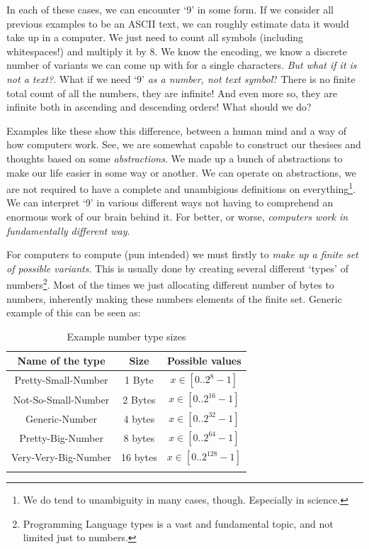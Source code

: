 \documentclass{article}
\begin{document}
            In each of these cases, we can encounter `9' in some form. If we consider all previous examples to be an ASCII text, we can roughly estimate data it would take up in 
            a computer. We just need to count all symbols (including whitespaces!) and multiply it by 8. We know the encoding, we know a discrete number of variants we can
            come up with for a single characters. \emph{But what if it is not a text?}. What if we need `9' \emph{as a number, not text symbol}? There is no finite total count
            of all the numbers, they are infinite! And even more so, they are infinite both in ascending and descending orders! What should we do? \par
            
            Examples like these show this difference, between a human mind and a way of how computers work. See, we are somewhat capable to construct our thesises and thoughts
            based on some \emph{abstractions}. We made up a bunch of abstractions to make our life easier in some way or another. We can operate on abstractions, we are not required
            to have a complete and unambigious definitions on everything\footnote{We do tend to unambiguity in many cases, though. Especially in science.}. We can interpret `9' in various
            different ways not having to comprehend an enormous work of our brain behind it. For better, or worse, \emph{computers work in fundamentally different way}.
            
            For computers to compute (pun intended) we must firstly to \emph{make up a finite set of possible variants}. This is usually done by creating several different
            `types' of numbers\footnote{Programming Language types is a vast and fundamental topic, and not limited just to numbers.}. Most of the times we just allocating 
            different number of bytes to numbers, inherently making these numbers elements of the finite set. Generic example of this can be seen as:
            
            \begin{table}[H]
                \centering
                \begin{longtable}{|c|c|c|}
                    \hline
                    Name of the type & Size & Possible values \\\hline
                    Pretty-Small-Number & 1 Byte & $x \in [0..2^8 - 1]$ \\\hline
                    Not-So-Small-Number & 2 Bytes & $x \in [0..2^{16} - 1]$\\\hline
                    Generic-Number & 4 bytes & $x \in [0..2^{32} - 1]$\\\hline
                    Pretty-Big-Number & 8 bytes & $x \in [0..2^{64} - 1]$\\\hline
                    Very-Very-Big-Number & 16 bytes & $x \in [0..2^{128} - 1]$\\\hline
                    \caption{Example number type sizes}

                \end{longtable}
            \end{table}
            
\end{document}
